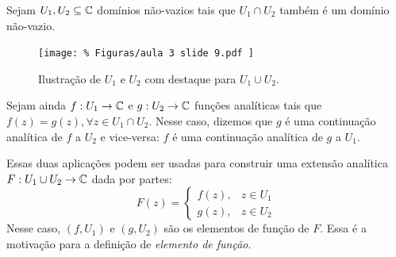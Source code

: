     \begin{observacao}
        Sejam $U_1, U_2\subseteq\mathbb{C}$ domínios não-vazios tais que $U_1\cap U_2$
        também é um domínio não-vazio.
        \begin{figure}[H]\centering
            \texttt{[image: \%
                Figuras/aula 3 slide 9.pdf
            ]}
            \caption{%
                Ilustração de $U_1$ e $U_2$ com destaque para $U_1\cup U_2$.
            }
        \end{figure}
        Sejam ainda $f:U_1\to\mathbb{C}$ e $g:U_2\to\mathbb{C}$ funções analíticas
        tais que $f(z) = g(z), \forall z\in U_1\cap U_2$. Nesse caso, dizemos que
        $g$ é uma continuação analítica de $f$ a $U_2$ e vice-versa: $f$ é 
        uma continuação analítica de $g$ a $U_1$.
        
        Essas duas aplicações podem ser usadas para construir uma extensão analítica
        $F: U_1\cup U_2\to\mathbb{C}$ dada por partes:
        \begin{equation*}
            F(z) = 
            \begin{cases}
                f(z), & z\in U_1 \\
                g(z), & z\in U_2
            \end{cases}
        \end{equation*}
        Nesse caso, $(f,U_1)$ e $(g,U_2)$ são os elementos de função de $F$. 
        Essa é a motivação para a definição de \textit{elemento de função}.
        

\end{observacao}
